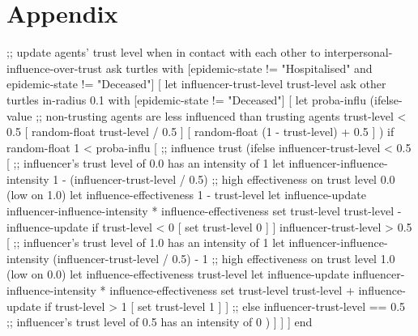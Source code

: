 \appendix \chapter{Appendix}
\label{chap:appendix}

\begin{algorithm}[language=NetLogo, caption={Interpersonal influence over trust}, label={algo:interpersonal}]
;; update agents' trust level when in contact with each other
to interpersonal-influence-over-trust
  ask turtles with [epidemic-state != "Hospitalised" and epidemic-state != "Deceased"] [
    let influencer-trust-level trust-level
    ask other turtles in-radius 0.1 with [epidemic-state != "Deceased"] [
      let proba-influ (ifelse-value
        ;; non-trusting agents are less influenced than trusting agents
        trust-level < 0.5 [ random-float trust-level / 0.5 ]
        [ random-float (1 - trust-level) + 0.5 ]
      )
      if random-float 1 < proba-influ
      [
        ;; influence trust
        (ifelse
          influencer-trust-level < 0.5
          [
            ;; influencer's trust level of 0.0 has an intensity of 1
            let influencer-influence-intensity 1 - (influencer-trust-level / 0.5)
            ;; high effectiveness on trust level 0.0 (low on 1.0)
            let influence-effectiveness 1 - trust-level
            let influence-update influencer-influence-intensity * influence-effectiveness
            set trust-level trust-level - influence-update
            if trust-level < 0 [ set trust-level 0 ]
          ]
          influencer-trust-level > 0.5
          [
            ;; influencer's trust level of 1.0 has an intensity of 1
            let influencer-influence-intensity (influencer-trust-level / 0.5) - 1
            ;; high effectiveness on trust level 1.0 (low on 0.0)
            let influence-effectiveness trust-level
            let influence-update influencer-influence-intensity * influence-effectiveness
            set trust-level trust-level + influence-update
            if trust-level > 1 [ set trust-level 1 ]
          ]
          ;; else influencer-trust-level == 0.5
          ;; influencer's trust level of 0.5 has an intensity of 0
        )
      ]
    ]
  ]
end
\end{algorithm}

\newpage

